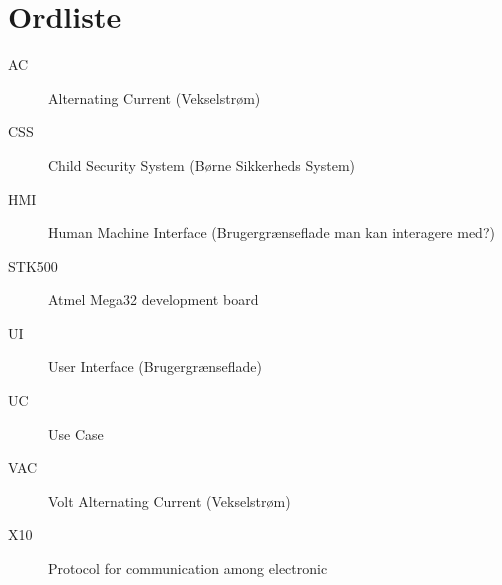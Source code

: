\chapter{Ordliste}

\begin{description}

\item[AC] Alternating Current (Vekselstrøm)
\item[CSS] Child Security System (Børne Sikkerheds System)
\item[HMI] Human Machine Interface (Brugergrænseflade man kan interagere med?)
\item[STK500] Atmel Mega32 development board
\item[UI] User Interface (Brugergrænseflade)
\item[UC] Use Case
\item[VAC] Volt Alternating Current (Vekselstrøm)
\item[X10] Protocol for communication among electronic

\end{description}